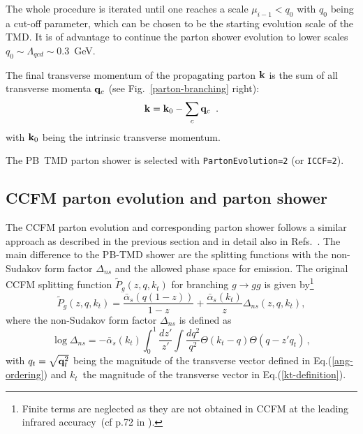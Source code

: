 \documentclass[11pt]{article} \usepackage{mystyle-new}
\def\prp{t}
\def\kt{\ensuremath{k_{\prp}}}
\newcommand{\alphasb}{\bar{\alpha}_s}
\def\PB{{PB}}
\begin{document}
The whole procedure is iterated until one reaches a scale $\mu_{i-1} < q_0$ with $q_0$ being a cut-off parameter, which can be chosen to be the starting evolution scale of the TMD. It is of advantage to continue the parton shower evolution to lower  scales $q_0 \sim \Lambda_{qcd} \sim 0.3$~GeV.

The final transverse momentum of the propagating parton 
${\bf k }$   is the sum of all transverse momenta ${\bf q}_c$ (see Fig.~\ref{parton-branching} right):
\begin{equation}
 {\bf k } =  {\bf k }_0 - \sum_c {\bf q}_c    \;\; .
\label{kt_calc}
\end{equation}
with  ${\bf k }_0 $ being the intrinsic transverse momentum.

The \PB\ TMD parton shower is selected with \verb+PartonEvolution=2+ (or \verb+ICCF=2+).


\subsection{CCFM parton evolution and parton shower} 
\label{sec:CCFMshower}
The CCFM parton evolution and corresponding parton shower follows a similar approach as described in the previous section and in detail also in Refs.~\cite{Jung:2000hk,Jung:2001hx,Jung:2010si,Hautmann:2008vd}. The main difference to the \PB -TMD shower are the splitting functions with the non-Sudakov form factor $\Delta_{ns}$ and the allowed phase space for emission.
The original CCFM splitting function $\tilde{P}_g (z,q,\kt)$ for branching $g\to g g$  is given by\footnote{Finite terms are neglected as they are not obtained in CCFM at the leading infrared accuracy~(cf p.72 in \cite{Catani:1989sg}).} 
\begin{equation}
\tilde{P}_g (z,q,\kt)
= \frac{\alphasb(q(1-z))}{1-z} + 
\frac{\alphasb(\kt)}{z} \Delta_{ns}(z,q,\kt),
\label{Pgg}
\end{equation}
where the non-Sudakov form factor $\Delta_{ns}$ is defined as 
\begin{equation}
\log\Delta_{ns} =  -\alphasb(\kt)
                  \int_0^1 \frac{dz'}{z'} 
                        \int \frac{d q^2}{q^2} 
              \Theta(\kt-q)\Theta(q-z'q_{t}) \, ,
                  \label{non_sudakov}                   
\end{equation}
with $q_t= \sqrt{{\bf q}_{t}^2}$ being the magnitude of the transverse vector defined in Eq.(\ref{ang-ordering}) and \kt\  the magnitude of the 
transverse vector   in Eq.(\ref{kt-definition}).
\end{document}
